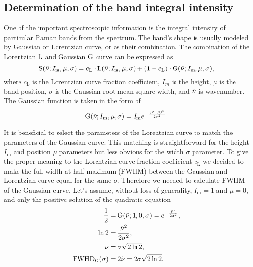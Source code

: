 \subsection{Determination of the band integral intensity}
\label{band_intensities}

One of the important spectroscopic information is the integral intensity of
particular Raman bands from the spectrum. The band's shape is usually modeled
by Gaussian or Lorentzian curve, or as their combination. The combination of
the Lorentzian $\operatorname{L}$ and Gaussian $\operatorname{G}$ curve can be expressed as
\begin{equation}
	\func{S}(\wn; I_\text{m}, \mu, \sigma) =
		c_\text{L} \cdot \func{L}(\wn; I_\text{m}, \mu, \sigma)
		+ (1 - c_\text{L}) \cdot \func{G}(\wn; I_\text{m}, \mu, \sigma),
	\label{\eqnlabel{band_intensities:single_shape}}
\end{equation}
where $c_\text{L}$ is the Lorentzian curve fraction coefficient, $I_m$ is the
height, $\mu$ is the band position, $\sigma$ is the Gaussian root mean square
width, and $\tilde{\nu}$ is wavenumber. The Gaussian function is taken in the form of
\begin{equation*}
	\operatorname{G}(\tilde{\nu}; I_\text{m}, \mu, \sigma) =
		I_\text{m} e^{-\frac{(\tilde{\nu} - \mu)^2}{2\sigma^2}}.
\end{equation*}

It is beneficial to select the parameters of the Lorentzian curve to match the
parameters of the Gaussian curve. This matching is straightforward for the
height $I_\text{m}$ and position $\mu$ parameters but less obvious for the
width $\sigma$ parameter. To give the proper meaning to the Lorentzian curve
fraction coefficient $c_\text{L}$ we decided to make the full width at half
maximum (FWHM) between the Gaussian and Lorentzian curve equal for the same
$\sigma$. Therefore we needed to calculate FWHM of the Gaussian curve. Let's
assume, without loss of generality,
$I_\text{m} = 1$
and
$\mu = 0$,
and only the positive solution of the quadratic equation
\begin{align}
	\frac{1}{2} &= \func{G}(\wn; 1, 0, \sigma)
		= e^{-\frac{\wn^2}{2\sigma^2}}, \nonumber \\
	\func{ln}2  &= \frac{\wn^2}{2\sigma^2}, \nonumber \\
	\wn         &= \sigma\sqrt{2\ln2},
		\label{\eqnlabel{band_intensities:HWHM}}\\
	\func{FWHD}_\text{G}(\sigma)
	            &= 2\wn = 2\sigma\sqrt{2\ln2}. \nonumber
\end{align}

